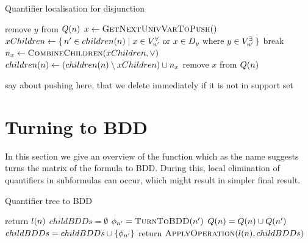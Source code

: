 \documentclass[
  digital, %
  twoside, %
  table,   %
  nolof,     %
  nolot,     %
]{fithesis3}
\let\setbuilder\set
\newcommand{\simpleset}[1]{\{{#1}\}}
\renewcommand{\set}[1]{\normalexpandarg\IfSubStr{#1}{|}{\setbuilder{#1}}{\simpleset{#1}}}
\theoremstyle{definition}
\theoremstyle{remark}
\newcommand{\evars}[1]{V_{#1}^{\exists}}
\newcommand{\uvars}[1]{V_{#1}^{\forall}}
\begin{document}
\begin{algorithm}
  \caption{Quantifier localisation for disjunction}
  \label{alg:localiseor}
  \begin{algorithmic}[1]
      \ForAll{$y \in \prefix{n} \cap \evars{n}$}
          \State {}
        \EndFor
        \State remove $y$ from $Q({n})$
      \EndFor
      \While{$\prefix{n} \cap \uvars{n} \not= \emptyset$}
        \State $x \gets \Call{GetNextUnivVarToPush}{\null}$
        \State $xChildren \gets \set{n' \in \children{n} | x \in \uvars{n'} \text{ or } x \in D_y \text{ where } y \in \evars{n'}}$
          \State break
        \Else
          \State $n_x \gets \Call{CombineChildren}{xChildren, {\lor}}$
          \State $children({n}) \gets (children({n}) \setminus xChildren) \cup n_x$
          \State {}
          \State remove $x$ from $Q({n})$
        \EndIf
      \EndWhile
    \EndFunction
  \end{algorithmic}
\end{algorithm}



say about pushing here, that we delete immediately if it is not in support set

\section{Turning to BDD}
In this section we give an overview of the function  which as the name suggests turns the matrix of the formula to BDD. During this, local elimination of quantifiers in subformulas can occur, which might result in simpler final result. 

\begin{algorithm}
  \caption{Quantifier tree to BDD}
  \label{alg:turntobdd}
  \begin{algorithmic}[1]
        \State return $l({n})$ \label{turntobdd:returnterminal}
      \Else
        \State $childBDDs = \emptyset$
          \State $\phi_{n'} = \Call{TurnToBDD}{n'}$ \label{turntobdd:callforchild}
          \State {} \label{turntobdd:eliminate}
          \State $Q({n}) = Q({n}) \cup Q({n'})$ \label{turntobdd:pullquantifiers}
          \State $childBDDs = childBDDs \cup \set{\phi_{n'}}$ %
        \EndFor
        \State return $\Call{ApplyOperation}{\qtlabel{n}, childBDDs}$ \label{turntobdd:returnnonterminal}
      \EndIf
    \EndFunction
  \end{algorithmic}
\end{algorithm}
\end{document}
